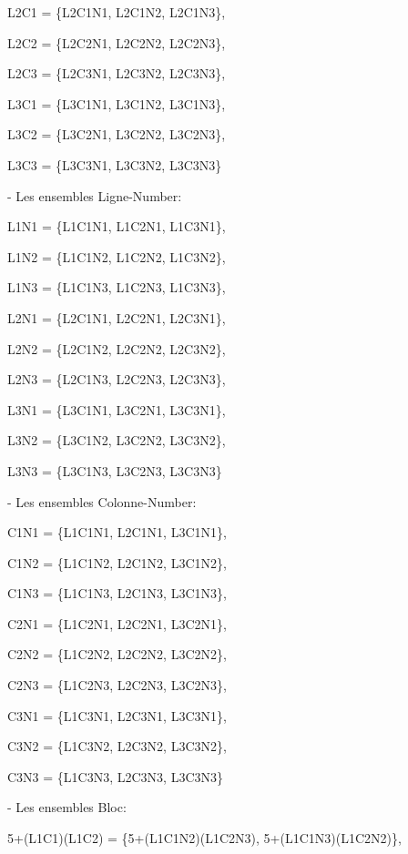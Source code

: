\documentclass[1]{report}
\begin{document}
    L2C1 = \{L2C1N1, L2C1N2, L2C1N3\},
    
    L2C2 = \{L2C2N1, L2C2N2, L2C2N3\},
    
    L2C3 = \{L2C3N1, L2C3N2, L2C3N3\},
    
    L3C1 = \{L3C1N1, L3C1N2, L3C1N3\},
    
    L3C2 = \{L3C2N1, L3C2N2, L3C2N3\},
    
    L3C3 = \{L3C3N1, L3C3N2, L3C3N3\} \newline
    
    - Les ensembles Ligne-Number: \newline
    
    L1N1 = \{L1C1N1, L1C2N1, L1C3N1\},
    
    L1N2 = \{L1C1N2, L1C2N2, L1C3N2\},
    
    L1N3 = \{L1C1N3, L1C2N3, L1C3N3\},
    
    L2N1 = \{L2C1N1, L2C2N1, L2C3N1\},
    
    L2N2 = \{L2C1N2, L2C2N2, L2C3N2\},
    
    L2N3 = \{L2C1N3, L2C2N3, L2C3N3\},
    
    L3N1 = \{L3C1N1, L3C2N1, L3C3N1\},
    
    L3N2 = \{L3C1N2, L3C2N2, L3C3N2\},
    
    L3N3 = \{L3C1N3, L3C2N3, L3C3N3\} \newline
    
    - Les ensembles Colonne-Number: \newline
    
    C1N1 = \{L1C1N1, L2C1N1, L3C1N1\},
    
    C1N2 = \{L1C1N2, L2C1N2, L3C1N2\},
    
    C1N3 = \{L1C1N3, L2C1N3, L3C1N3\},
    
    C2N1 = \{L1C2N1, L2C2N1, L3C2N1\},
    
    C2N2 = \{L1C2N2, L2C2N2, L3C2N2\},
    
    C2N3 = \{L1C2N3, L2C2N3, L3C2N3\},
    
    C3N1 = \{L1C3N1, L2C3N1, L3C3N1\},
    
    C3N2 = \{L1C3N2, L2C3N2, L3C3N2\},
    
    C3N3 = \{L1C3N3, L2C3N3, L3C3N3\} \newline
    
    - Les ensembles Bloc: \newline
    
    5+(L1C1)(L1C2) = \{5+(L1C1N2)(L1C2N3), 5+(L1C1N3)(L1C2N2)\},
    
\end{document}
